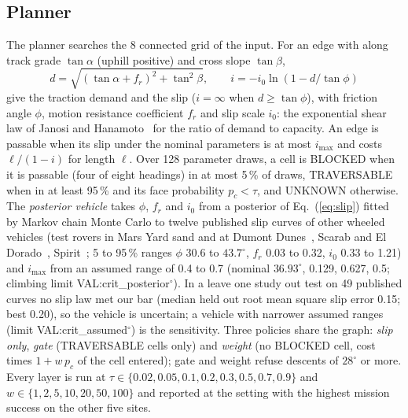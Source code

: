 \subsection{Planner}\label{sec:planner}
The planner searches the 8 connected grid of the input. For an edge with along track grade $\tan\alpha$ (uphill positive) and cross slope $\tan\beta$,
\begin{equation}
d=\sqrt{(\tan\alpha+f_r)^2+\tan^2\beta},\qquad i=-i_0\ln\left(1-d/\tan\phi\right)
\label{eq:slip}
\end{equation}
give the traction demand and the slip ($i=\infty$ when $d\ge\tan\phi$), with friction angle $\phi$, motion resistance coefficient $f_r$ and slip scale $i_0$: the exponential shear law of Janosi and Hanamoto~\cite{janosi1961} for the ratio of demand to capacity. An edge is passable when its slip under the nominal parameters is at most $i_{\max}$ and costs $\ell/(1-i)$ for length $\ell$. Over 128 parameter draws, a cell is BLOCKED when it is passable (four of eight headings) in at most 5\,\% of draws, TRAVERSABLE when in at least 95\,\% and its face probability $p_c<\tau$, and UNKNOWN otherwise. The \emph{posterior vehicle} takes $\phi$, $f_r$ and $i_0$ from a posterior of Eq.~(\ref{eq:slip}) fitted by Markov chain Monte Carlo to twelve published slip curves of other wheeled vehicles (test rovers in Mars Yard sand and at Dumont Dunes~\cite{heverly2013}, Scarab and El Dorado~\cite{inotsume2016thesis}, Spirit~\cite{li2008spirit}; 5 to 95\,\% ranges $\phi$ 30.6 to $43.7^\circ$, $f_r$ 0.03 to 0.32, $i_0$ 0.33 to 1.21) and $i_{\max}$ from an assumed range of 0.4 to 0.7 (nominal $36.93^\circ$, 0.129, 0.627, 0.5; climbing limit {{VAL:crit_posterior}}$^\circ$). In a leave one study out test on 49 published curves no slip law met our bar (median held out root mean square slip error 0.15; best 0.20), so the vehicle is uncertain; a vehicle with narrower assumed ranges (limit {{VAL:crit_assumed}}$^\circ$) is the sensitivity. Three policies share the graph: \emph{slip only}, \emph{gate} (TRAVERSABLE cells only) and \emph{weight} (no BLOCKED cell, cost times $1+w\,p_c$ of the cell entered); gate and weight refuse descents of $28^\circ$ or more. Every layer is run at $\tau\in\{0.02,0.05,0.1,0.2,0.3,0.5,0.7,0.9\}$ and $w\in\{1,2,5,10,20,50,100\}$ and reported at the setting with the highest mission success on the other five sites.

